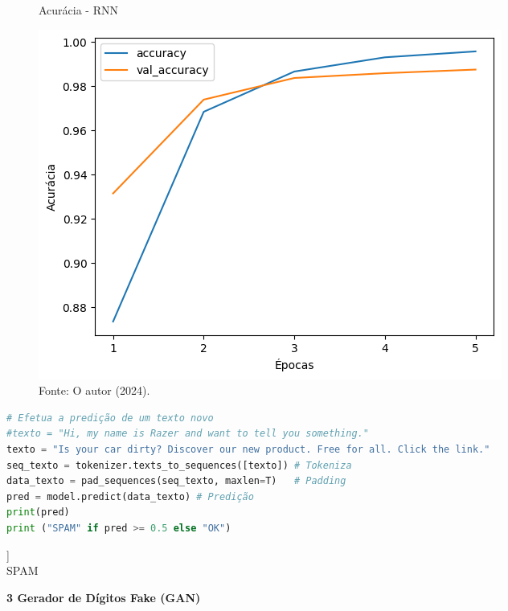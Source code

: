 \begin{figure}[H]
\centering
\caption{Acurácia - RNN}
\includegraphics[width=.8\linewidth]{apendices/fig/9_IAA009_6.png}
\caption*{Fonte: O autor (2024).}
\end{figure}

\begin{lstlisting}[language=Python, style=input]
# Efetua a predição de um texto novo
#texto = "Hi, my name is Razer and want to tell you something."
texto = "Is your car dirty? Discover our new product. Free for all. Click the link."
seq_texto = tokenizer.texts_to_sequences([texto]) # Tokeniza
data_texto = pad_sequences(seq_texto, maxlen=T)   # Padding
pred = model.predict(data_texto) # Predição
print(pred)
print ("SPAM" if pred >= 0.5 else "OK")
\end{lstlisting}

\begin{tcolorbox}[myoutputstyle]
[[0.7768526]]\\
SPAM
\end{tcolorbox}


\begin{adjustwidth}{1em}{}
\textbf{3 Gerador de Dígitos Fake (GAN)}
\end{adjustwidth}

